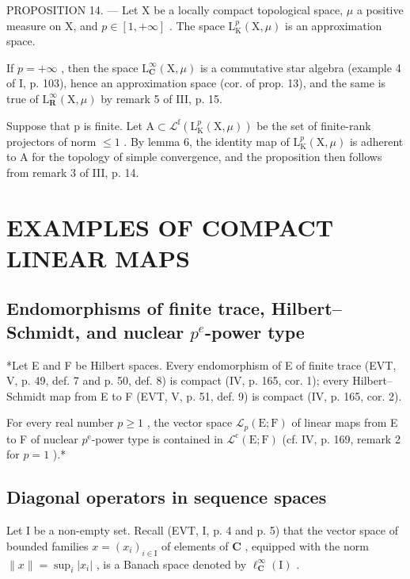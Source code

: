 PROPOSITION 14. --- Let X be a locally compact topological space, \(\mu\) a positive measure on X, and \(p \in [1, +\infty]\) . The space \(\mathrm{L}_{\mathrm{K}}^{p}(\mathrm{X}, \mu)\) is an approximation space.

If \(p = +\infty\) , then the space \(\mathrm{L}_{\mathbf{C}}^{\infty}(\mathrm{X},\mu)\) is a commutative star algebra (example 4 of I, p. 103), hence an approximation space (cor. of prop. 13), and the same is true of \(\mathrm{L}_{\mathbf{R}}^{\infty}(\mathrm{X},\mu)\) by remark 5 of III, p. 15.

Suppose that p is finite. Let \(\mathrm{A}\subset\mathcal{L}^{\mathrm{f}}(\mathrm{L}_{\mathrm{K}}^{p}(\mathrm{X},\mu))\) be the set of finite-rank projectors of norm \(\leqslant1\) . By lemma 6, the identity map of \(\mathrm{L}_{\mathrm{K}}^{p}(\mathrm{X},\mu)\) is adherent to A for the topology of simple convergence, and the proposition then follows from remark 3 of III, p. 14.

\section{EXAMPLES OF COMPACT LINEAR MAPS}

\subsection{\texorpdfstring{Endomorphisms of finite trace, Hilbert--Schmidt, and nuclear \(p^{e}\)-power type}{Endomorphisms of finite trace, Hilbert--Schmidt, and nuclear p\^{}\{e\}-power type}}

*Let E and F be Hilbert spaces. Every endomorphism of E of finite trace (EVT, V, p. 49, def. 7 and p. 50, def. 8) is compact (IV, p. 165, cor. 1); every Hilbert--Schmidt map from E to F (EVT, V, p. 51, def. 9) is compact (IV, p. 165, cor. 2).

For every real number \(p \geqslant 1\) , the vector space \(\mathcal{L}_{p}(\mathrm{E};\mathrm{F})\) of linear maps from E to F of nuclear \(p^{\mathrm{e}}\)-power type is contained in \(\mathcal{L}^{\mathrm{c}}(\mathrm{E};\mathrm{F})\) (cf. IV, p. 169, remark 2 for \(p = 1\) ).*

\subsection{Diagonal operators in sequence spaces}

Let I be a non-empty set. Recall (EVT, I, p. 4 and p. 5) that the vector space of bounded families \(x = (x_i)_{i \in \mathrm{I}}\) of elements of \(\mathbf{C}\) , equipped with the norm \(\| x \| = \sup_i |x_i|\) , is a Banach space denoted by \(\ell_{\mathbf{C}}^{\infty}(\mathrm{I})\) .

